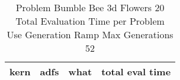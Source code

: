\begin{table}[H]
\caption{Problem  Bumble Bee 3d  Flowers 20\\Total Evaluation Time per Problem \\ Use Generation Ramp  Max Generations 52\\}
\begin{center}
\scalebox{1.0} %
{
\begin{tabular}{lllr}
\hline
kern & adfs & what & total eval time \\
\hline


\end{tabular}
}
\end{center}
\end{table}

